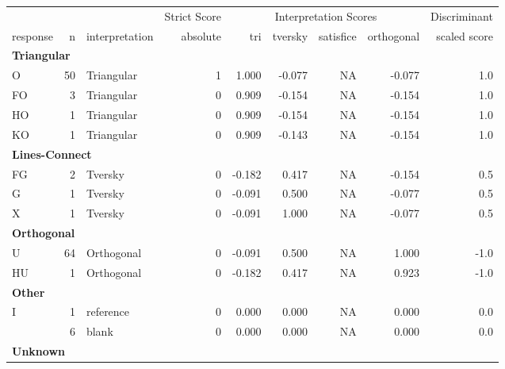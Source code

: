 \documentclass[
  letterpaper,
  DIV=11,
  numbers=noendperiod]{scrreprt}
\begin{document}
\begin{tabular}[t]{l|r|l|r|r|r|r|r|r}
\hline
\multicolumn{3}{c|}{ } & \multicolumn{1}{c|}{Strict Score} & \multicolumn{4}{c|}{Interpretation Scores} & \multicolumn{1}{c}{Discriminant} \\
\cline{4-4} \cline{5-8} \cline{9-9}
response & n & interpretation & absolute & tri & tversky & satisfice & orthogonal & scaled score\\
\hline
\multicolumn{9}{l}{\textbf{Triangular}}\\
\hline
\hspace{1em}O & 50 & Triangular & 1 & 1.000 & -0.077 & NA & -0.077 & 1.0\\
\hline
\hspace{1em}FO & 3 & Triangular & 0 & 0.909 & -0.154 & NA & -0.154 & 1.0\\
\hline
\hspace{1em}HO & 1 & Triangular & 0 & 0.909 & -0.154 & NA & -0.154 & 1.0\\
\hline
\hspace{1em}KO & 1 & Triangular & 0 & 0.909 & -0.143 & NA & -0.154 & 1.0\\
\hline
\multicolumn{9}{l}{\textbf{Lines-Connect}}\\
\hline
\hspace{1em}FG & 2 & Tversky & 0 & -0.182 & 0.417 & NA & -0.154 & 0.5\\
\hline
\hspace{1em}G & 1 & Tversky & 0 & -0.091 & 0.500 & NA & -0.077 & 0.5\\
\hline
\hspace{1em}X & 1 & Tversky & 0 & -0.091 & 1.000 & NA & -0.077 & 0.5\\
\hline
\multicolumn{9}{l}{\textbf{Orthogonal}}\\
\hline
\hspace{1em}U & 64 & Orthogonal & 0 & -0.091 & 0.500 & NA & 1.000 & -1.0\\
\hline
\hspace{1em}HU & 1 & Orthogonal & 0 & -0.182 & 0.417 & NA & 0.923 & -1.0\\
\hline
\multicolumn{9}{l}{\textbf{Other}}\\
\hline
\hspace{1em}I & 1 & reference & 0 & 0.000 & 0.000 & NA & 0.000 & 0.0\\
\hline
\hspace{1em} & 6 & blank & 0 & 0.000 & 0.000 & NA & 0.000 & 0.0\\
\hline
\multicolumn{9}{l}{\textbf{Unknown}}\\

\end{tabular}
\end{document}
